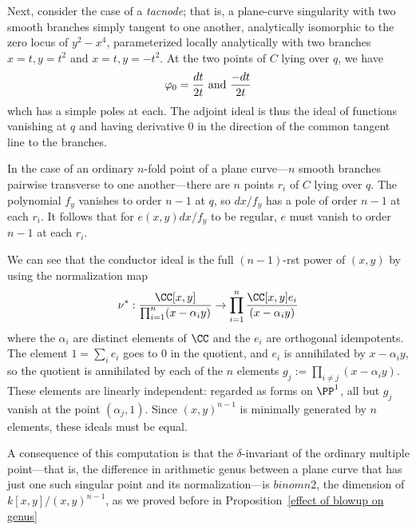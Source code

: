 \begin{example}[tacnodes]
Next, consider the case of a \emph{tacnode}; that is, a plane-curve singularity with two smooth branches simply tangent to one another, analytically isomorphic to the zero locus of $y^2-x^4$, parameterized locally analytically with two branches $x = t, y =  t^{2}$ and $x=t, y = -t^{2}$.
At the two points of $C$ lying over $q$, we have
  $$
 \varphi_0 =  \frac{dt}{ 2t} \hbox{ and } \frac{-dt}{ 2t}
 $$ 
whch has a simple poles at each. 
The adjoint ideal is thus the ideal of functions vanishing at $q$ and having derivative 0 in the direction of the common tangent line to the branches.
\end{example}

\begin{example}
In the case of an ordinary $n$-fold point of a plane curve---$n$ smooth branches pairwise transverse to one another---there are $n$ points
$r_i$ of $C$ lying over $q$. The polynomial $f_y$ vanishes to order $n-1$ at $q$, so $dx/f_y$ has a pole of order $n-1$ at
each $r_i$. It follows that for $e(x,y)dx/f_y$ to be regular, $e$ must vanish to order $n-1$ at each $r_i$. 

We can see that the conductor ideal is the full $(n-1)$-rst power of $(x,y)$ by using the
normalization map
$$
\nu^{*}: \frac{\CC[x,y]}{\prod_{i=1}^{n} (x-\alpha_{i}y)} \to
 \prod_{i=1}^{n} \frac{\CC[x,y]e_{i}}{(x-\alpha_{i}y)}
$$
where the $\alpha_{i}$ are distinct elements of $\CC$ and the $e_{i}$ are orthogonal idempotents.
The element $1 = \sum_{i}e_{i}$ goes to 0 in the quotient, and $e_{i}$ is annihilated by $x-\alpha_{i}y$,
so the quotient is annihilated by each of the $n$ elements $g_{j} := \prod_{i\neq j} (x-\alpha_{i}y)$.
These elements are linearly independent: regarded as forms on $\PP^{1}$, all but $g_{j}$ vanish at the 
point $(\alpha_{j}, 1)$. Since $(x,y)^{n-1}$ is minimally generated by $n$ elements, these ideals must be equal.

A consequence of this computation is that the $\delta$-invariant of the ordinary multiple point---that is, the difference in arithmetic genus between a plane curve that has just one such singular point and its normalization---is $binom{n}{2}$, the dimension of $k[x,y]/(x,y)^{n-1}$, as we proved before in Proposition~\ref{effect of blowup on genus} \end{example}

